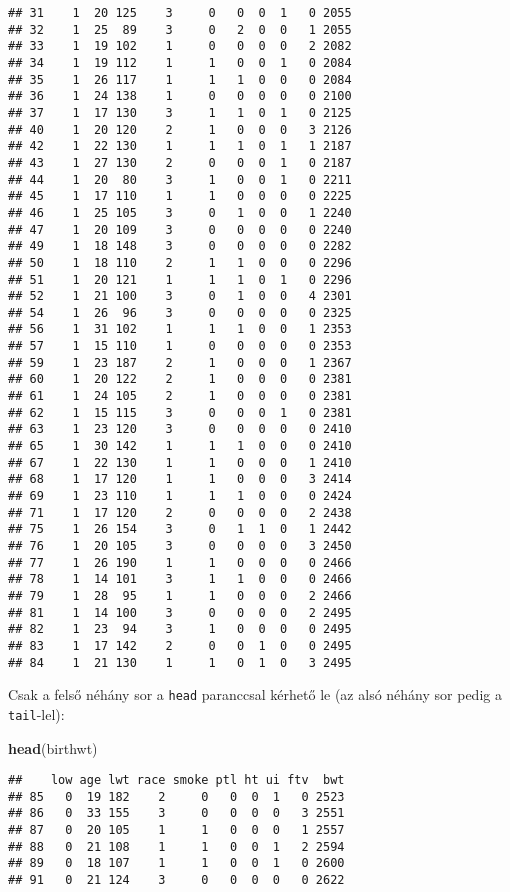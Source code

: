 \documentclass[]{book}
\newenvironment{Shaded}{\begin{snugshade}}{\end{snugshade}}
\newcommand{\KeywordTok}[1]{\textcolor[rgb]{0.13,0.29,0.53}{\textbf{#1}}}
\newcommand{\NormalTok}[1]{#1}
\begin{document}
\begin{verbatim}
## 31    1  20 125    3     0   0  0  1   0 2055
## 32    1  25  89    3     0   2  0  0   1 2055
## 33    1  19 102    1     0   0  0  0   2 2082
## 34    1  19 112    1     1   0  0  1   0 2084
## 35    1  26 117    1     1   1  0  0   0 2084
## 36    1  24 138    1     0   0  0  0   0 2100
## 37    1  17 130    3     1   1  0  1   0 2125
## 40    1  20 120    2     1   0  0  0   3 2126
## 42    1  22 130    1     1   1  0  1   1 2187
## 43    1  27 130    2     0   0  0  1   0 2187
## 44    1  20  80    3     1   0  0  1   0 2211
## 45    1  17 110    1     1   0  0  0   0 2225
## 46    1  25 105    3     0   1  0  0   1 2240
## 47    1  20 109    3     0   0  0  0   0 2240
## 49    1  18 148    3     0   0  0  0   0 2282
## 50    1  18 110    2     1   1  0  0   0 2296
## 51    1  20 121    1     1   1  0  1   0 2296
## 52    1  21 100    3     0   1  0  0   4 2301
## 54    1  26  96    3     0   0  0  0   0 2325
## 56    1  31 102    1     1   1  0  0   1 2353
## 57    1  15 110    1     0   0  0  0   0 2353
## 59    1  23 187    2     1   0  0  0   1 2367
## 60    1  20 122    2     1   0  0  0   0 2381
## 61    1  24 105    2     1   0  0  0   0 2381
## 62    1  15 115    3     0   0  0  1   0 2381
## 63    1  23 120    3     0   0  0  0   0 2410
## 65    1  30 142    1     1   1  0  0   0 2410
## 67    1  22 130    1     1   0  0  0   1 2410
## 68    1  17 120    1     1   0  0  0   3 2414
## 69    1  23 110    1     1   1  0  0   0 2424
## 71    1  17 120    2     0   0  0  0   2 2438
## 75    1  26 154    3     0   1  1  0   1 2442
## 76    1  20 105    3     0   0  0  0   3 2450
## 77    1  26 190    1     1   0  0  0   0 2466
## 78    1  14 101    3     1   1  0  0   0 2466
## 79    1  28  95    1     1   0  0  0   2 2466
## 81    1  14 100    3     0   0  0  0   2 2495
## 82    1  23  94    3     1   0  0  0   0 2495
## 83    1  17 142    2     0   0  1  0   0 2495
## 84    1  21 130    1     1   0  1  0   3 2495
\end{verbatim}

Csak a felső néhány sor a \texttt{head} paranccsal kérhető le (az alsó néhány sor pedig a \texttt{tail}-lel):

\begin{Shaded}
\begin{Highlighting}[]
\KeywordTok{head}\NormalTok{(birthwt)}
\end{Highlighting}
\end{Shaded}

\begin{verbatim}
##    low age lwt race smoke ptl ht ui ftv  bwt
## 85   0  19 182    2     0   0  0  1   0 2523
## 86   0  33 155    3     0   0  0  0   3 2551
## 87   0  20 105    1     1   0  0  0   1 2557
## 88   0  21 108    1     1   0  0  1   2 2594
## 89   0  18 107    1     1   0  0  1   0 2600
## 91   0  21 124    3     0   0  0  0   0 2622
\end{verbatim}
\end{document}
